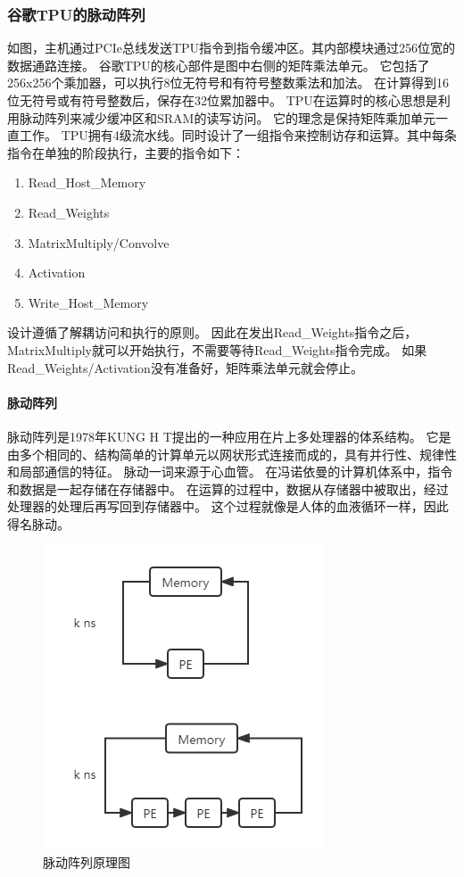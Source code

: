 \subsubsection{谷歌TPU的脉动阵列}
如图，主机通过PCIe总线发送TPU指令到指令缓冲区。其内部模块通过256位宽的数据通路连接。
谷歌TPU的核心部件是图中右侧的矩阵乘法单元。
它包括了256x256个乘加器，可以执行8位无符号和有符号整数乘法和加法。
在计算得到16位无符号或有符号整数后，保存在32位累加器中。
TPU在运算时的核心思想是利用脉动阵列来减少缓冲区和SRAM的读写访问。
它的理念是保持矩阵乘加单元一直工作。
TPU拥有4级流水线。同时设计了一组指令来控制访存和运算。其中每条指令在单独的阶段执行，主要的指令如下：
\begin{enumerate}
    \item Read\_Host\_Memory
    \item Read\_Weights
    \item MatrixMultiply/Convolve
    \item Activation
    \item Write\_Host\_Memory
\end{enumerate}
设计遵循了解耦访问和执行的原则。
因此在发出Read\_Weights指令之后，MatrixMultiply就可以开始执行，不需要等待Read\_Weights指令完成。
如果Read\_Weights/Activation没有准备好，矩阵乘法单元就会停止。

\paragraph{脉动阵列}
脉动阵列是1978年KUNG H T提出的一种应用在片上多处理器的体系结构。
它是由多个相同的、结构简单的计算单元以网状形式连接而成的，具有并行性、规律性和局部通信的特征。
脉动一词来源于心血管。
在冯诺依曼的计算机体系中，指令和数据是一起存储在存储器中。
在运算的过程中，数据从存储器中被取出，经过处理器的处理后再写回到存储器中。
这个过程就像是人体的血液循环一样，因此得名脉动。  
\begin{figure}[htbp]
    \centering
    \includegraphics[]{figures/systolic_array.png}
    \caption{脉动阵列原理图}
    \label{systolic}
\end{figure}   

